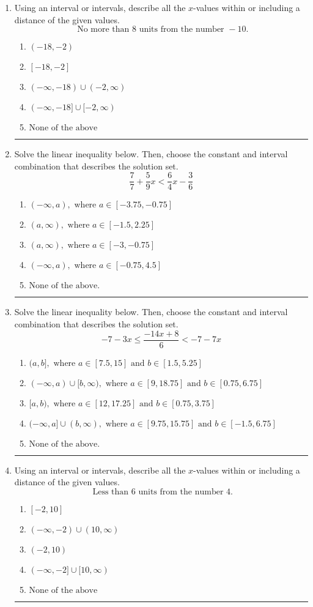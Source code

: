 \documentclass[14pt]{extbook}
\newcommand{\litem}[1]{\item#1\hspace*{-1cm}\rule{\textwidth}{0.4pt}}
\begin{document}
\begin{enumerate}
\litem{
Using an interval or intervals, describe all the $x$-values within or including a distance of the given values.\[ \text{ No more than } 8 \text{ units from the number } -10. \]\begin{enumerate}[label=\Alph*.]
\item \( (-18, -2) \)
\item \( [-18, -2] \)
\item \( (-\infty, -18) \cup (-2, \infty) \)
\item \( (-\infty, -18] \cup [-2, \infty) \)
\item \( \text{None of the above} \)

\end{enumerate} }
\litem{
Solve the linear inequality below. Then, choose the constant and interval combination that describes the solution set.\[ \frac{7}{7} + \frac{5}{9} x < \frac{6}{4} x - \frac{3}{6} \]\begin{enumerate}[label=\Alph*.]
\item \( (-\infty, a), \text{ where } a \in [-3.75, -0.75] \)
\item \( (a, \infty), \text{ where } a \in [-1.5, 2.25] \)
\item \( (a, \infty), \text{ where } a \in [-3, -0.75] \)
\item \( (-\infty, a), \text{ where } a \in [-0.75, 4.5] \)
\item \( \text{None of the above}. \)

\end{enumerate} }
\litem{
Solve the linear inequality below. Then, choose the constant and interval combination that describes the solution set.\[ -7 - 3 x \leq \frac{-14 x + 8}{6} < -7 - 7 x \]\begin{enumerate}[label=\Alph*.]
\item \( (a, b], \text{ where } a \in [7.5, 15] \text{ and } b \in [1.5, 5.25] \)
\item \( (-\infty, a) \cup [b, \infty), \text{ where } a \in [9, 18.75] \text{ and } b \in [0.75, 6.75] \)
\item \( [a, b), \text{ where } a \in [12, 17.25] \text{ and } b \in [0.75, 3.75] \)
\item \( (-\infty, a] \cup (b, \infty), \text{ where } a \in [9.75, 15.75] \text{ and } b \in [-1.5, 6.75] \)
\item \( \text{None of the above.} \)

\end{enumerate} }
\litem{
Using an interval or intervals, describe all the $x$-values within or including a distance of the given values.\[ \text{ Less than } 6 \text{ units from the number } 4. \]\begin{enumerate}[label=\Alph*.]
\item \( [-2, 10] \)
\item \( (-\infty, -2) \cup (10, \infty) \)
\item \( (-2, 10) \)
\item \( (-\infty, -2] \cup [10, \infty) \)
\item \( \text{None of the above} \)


\end{enumerate}}
\end{enumerate}
\end{document}
